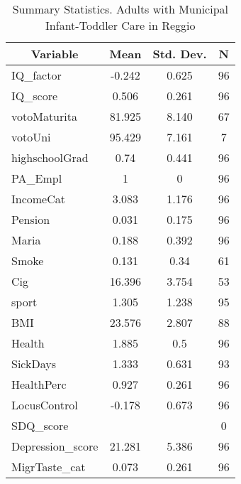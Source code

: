 
\begin{table}[htbp]\centering \caption{Summary Statistics. Adults with Municipal Infant-Toddler Care in Reggio \label{bothAdultasiloMuniReggio}}
\begin{tabular}{l c c  c}\hline\hline
\multicolumn{1}{c}{\textbf{Variable}} & \textbf{Mean}
 & \textbf{Std. Dev.} & \textbf{N}\\ \hline
IQ\_factor & -0.242 & 0.625  & 96\\
IQ\_score & 0.506 & 0.261  & 96\\
votoMaturita & 81.925 & 8.140  & 67\\
votoUni & 95.429 & 7.161  & 7\\
highschoolGrad & 0.74 & 0.441  & 96\\
PA\_Empl & 1 & 0  & 96\\
IncomeCat & 3.083 & 1.176  & 96\\
Pension & 0.031 & 0.175  & 96\\
Maria & 0.188 & 0.392  & 96\\
Smoke & 0.131 & 0.34  & 61\\
Cig & 16.396 & 3.754  & 53\\
sport & 1.305 & 1.238  & 95\\
BMI & 23.576 & 2.807  & 88\\
Health & 1.885 & 0.5  & 96\\
SickDays & 1.333 & 0.631  & 93\\
HealthPerc & 0.927 & 0.261  & 96\\
LocusControl & -0.178 & 0.673  & 96\\
SDQ\_score &  &   & 0\\
Depression\_score & 21.281 & 5.386  & 96\\
MigrTaste\_cat & 0.073 & 0.261  & 96\\
\hline\end{tabular}
\end{table}

